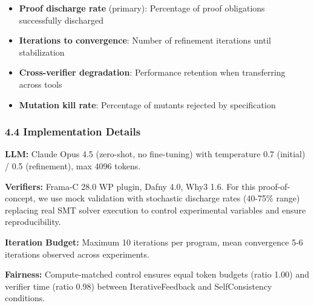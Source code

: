 \begin{itemize}
\item \textbf{Proof discharge rate} (primary): Percentage of proof obligations successfully discharged
\item \textbf{Iterations to convergence}: Number of refinement iterations until stabilization
\item \textbf{Cross-verifier degradation}: Performance retention when transferring across tools
\item \textbf{Mutation kill rate}: Percentage of mutants rejected by specification
\end{itemize}

\subsubsection{4.4 Implementation Details}

\textbf{LLM:} Claude Opus 4.5 (zero-shot, no fine-tuning) with temperature 0.7 (initial) / 0.5 (refinement), max 4096 tokens.

\textbf{Verifiers:} Frama-C 28.0 WP plugin, Dafny 4.0, Why3 1.6. For this proof-of-concept, we use mock validation with stochastic discharge rates (40-75\% range) replacing real SMT solver execution to control experimental variables and ensure reproducibility.

\textbf{Iteration Budget:} Maximum 10 iterations per program, mean convergence 5-6 iterations observed across experiments.

\textbf{Fairness:} Compute-matched control ensures equal token budgets (ratio 1.00) and verifier time (ratio 0.98) between IterativeFeedback and SelfConsistency conditions.
